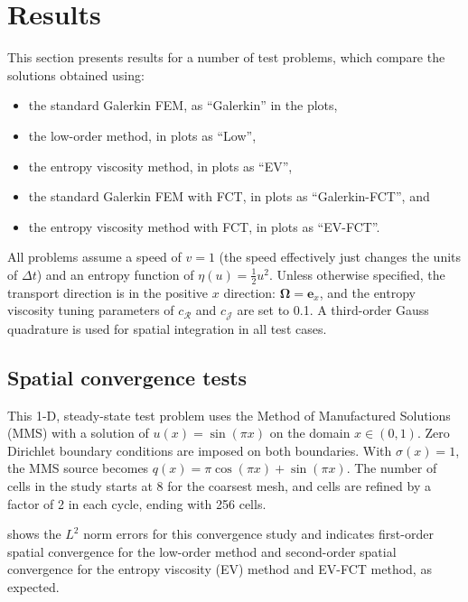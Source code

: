 \documentclass[xchauthor,chkrefs,fixeqskip,GCNS,amsmath,amsthm]{yjcphg}
\theoremstyle{remark}
\begin{document}
\section{Results}%
\label{sec:results}
This section presents results for a number of test problems, which
compare the solutions obtained using:
%
\begin{itemize}
%
\item
the standard Galerkin FEM,  as ``Galerkin'' in the plots,
%
\item
the low-order method,  in plots as ``Low'',
%
\item
the entropy viscosity method,  in plots as ``EV'',
%
\item
the standard Galerkin FEM with FCT,  in plots as
``Galerkin-FCT'', and
%
\item
the entropy viscosity method with FCT,  in plots as ``EV-FCT''.
\end{itemize}
%
All problems assume a speed of $v=1$ (the speed effectively just changes
the units of $\Delta t$) and an entropy function of $\eta(u)=
\frac{1}{2}u^{2}$. Unless otherwise specified, the transport direction
is in the positive $x$ direction: $\bm{\Omega}=\mathbf{e}_{x}$, and
the entropy viscosity tuning parameters of $c_{\mathcal{R}}$ and
$c_{\mathcal{J}}$ are set to 0.1. A third-order Gauss quadrature is used
for spatial integration in all test cases.

\subsection{Spatial convergence tests}

This 1-D, steady-state test problem uses the Method of Manufactured
Solutions (MMS) with a solution of $u(x)=\sin(\pi x)$ on the domain
$x\in(0,1)$. Zero Dirichlet boundary conditions are imposed on both
boundaries. With $\sigma(x)=1$, the MMS source becomes $q(x)=\pi
\cos(\pi x) + \sin(\pi x)$. The number of cells in the study starts
at 8 for the coarsest mesh, and cells are refined by a factor of 2 in
each cycle, ending with 256 cells.

 shows the $L^{2}$ norm errors for this
convergence study and indicates first-order spatial convergence for the
low-order method and second-order spatial convergence for the entropy
viscosity (EV) method and EV-FCT method, as expected.
\end{document}
